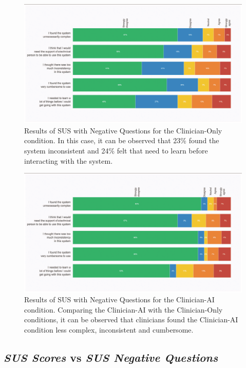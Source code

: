 \begin{figure}[htbp]
\centering
\includegraphics[width=\textwidth]{images/fig035}
\caption{Results of SUS with Negative Questions for the Clinician-Only condition. In this case, it can be observed that 23\% found the system inconsistent and 24\% felt that need to learn before interacting with the system.}
\label{fig:fig035}
\end{figure}

\begin{figure}[htbp]
\centering
\includegraphics[width=\textwidth]{images/fig036}
\caption{Results of SUS with Negative Questions for the Clinician-AI condition. Comparing the Clinician-AI with the Clinician-Only conditions, it can be observed that clinicians found the Clinician-AI condition less complex, inconsistent and cumbersome.}
\label{fig:fig036}
\end{figure}

\subsection{{\it SUS Scores} vs {\it SUS Negative Questions}}
\label{sec:app003004002}

